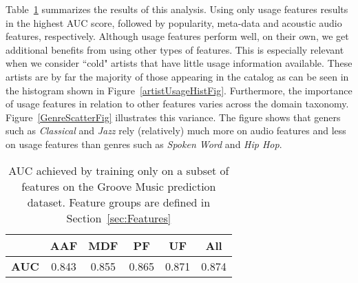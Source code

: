 Table~\ref{tab:features_AUC} summarizes the  results of this analysis. Using only usage features results in the highest AUC score, followed by popularity, meta-data and acoustic audio features, respectively. Although usage features perform well, on their own, we get additional benefits from using other types of features. This is especially relevant when we consider ``cold" artists that have little usage information available. These artists are by far the majority of those appearing in the catalog as can be seen in the histogram shown in Figure~\ref{artistUsageHistFig}.  Furthermore, the importance of usage features in relation to other features varies across the domain taxonomy. Figure~\ref{GenreScatterFig} illustrates this variance. The figure shows that geners such as \textit{Classical} and \textit{Jazz} rely (relatively) much more on audio features and less on usage features than genres such as \textit{Spoken Word} and \textit{Hip Hop}.


\begin{table}[h!]
\begin{center}
	\begin{tabular}{|c|c|c|c|c|c|}
		\hline
		 & {\bf AAF} & {\bf MDF} & {\bf PF} & {\bf UF} & {\bf All}\\ 
		\hline
		 {\bf AUC} & 0.843  & 0.855 & 0.865 & 0.871 & 0.874\\ 
		\hline
	\end{tabular}
	\vspace{-0.4cm}
\end{center}
\caption{AUC achieved by training only on a subset of features on the Groove Music prediction dataset. Feature groups are defined in Section~\ref{sec:Features}}
\label{tab:features_AUC}
\end{table}











